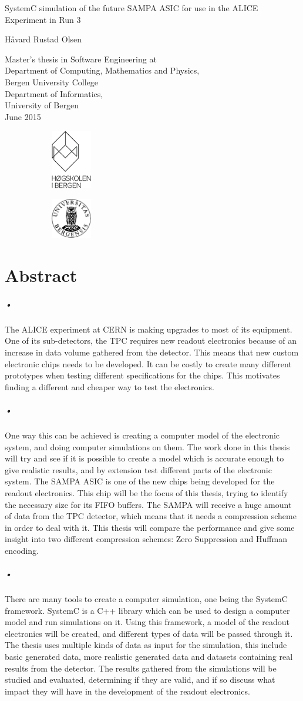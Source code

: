 \documentclass[a4paper, 12pt, openright, twoside]{report}
\newcommand*{\titlePage}{\begingroup %
\fontfamily{phv}\selectfont
\centering %

\vspace{200pt}
{\Huge SystemC simulation of the future SAMPA ASIC for use in the ALICE Experiment in Run 3} \\ %
\vspace{5pt}

{\Large \textsl{}} %
\vspace{50pt}

{\Large{H\r{a}vard Rustad Olsen}}\\ %

\vfill %

{\Large Master's thesis in Software Engineering at \\
\vspace{10pt}
Department of Computing, Mathematics and Physics, \\
Bergen University College \\
\vspace{10pt}
Department of  Informatics, \\
University of Bergen \\}
\vspace{10pt}
{\large June 2015} %


\begin{figure}[h]
		\begin{subfigure}[]{50pt}
			\includegraphics[width=50pt]{HIB_sort_hovedlogo.eps}
		\end{subfigure}
		\hfill
		\begin{subfigure}[]{50pt}
			\includegraphics[width=50pt]{uib-logo.eps}
		\end{subfigure}

\end{figure}

\endgroup}
\begin{document}
\pagestyle{empty} %

\titlePage %

\newpage
\mbox{}
\thispagestyle{empty}
\newpage

\chapter*{Abstract}

\paragraph{•}
The ALICE experiment at CERN is making upgrades to most of its equipment.
One of its sub-detectors, the TPC requires new readout electronics because of an increase in data volume gathered from the detector.
This means that new custom electronic chips needs to be developed.
It can be costly to create many different prototypes when testing different specifications for the chips.
This motivates finding a different and cheaper way to test the electronics.

\paragraph{•}
One way this can be achieved is creating a computer model of the electronic system, and doing computer simulations on them.
The work done in this thesis will try and see if it is possible to create a model which is accurate enough to give realistic results, and by extension test different parts of the electronic system.
The SAMPA ASIC is one of the new chips being developed for the readout electronics.
This chip will be the focus of this thesis, trying to identify the necessary size for its FIFO buffers.
The SAMPA will receive a huge amount of data from the TPC detector, which means that it needs a compression scheme in order to deal with it.
This thesis will compare the performance and give some insight into two different compression schemes: Zero Suppression and Huffman encoding.

\paragraph{•}
There are many tools to create a computer simulation, one being the SystemC framework.
SystemC is a C++ library which can be used to design a computer model and run simulations on it.
Using this framework, a model of the readout electronics will be created, and different types of data will be passed through it.
The thesis uses multiple kinds of data as input for the simulation, this include basic generated data, more realistic generated data and datasets containing real results from the detector.
The results gathered from the simulations will be studied and evaluated, determining if they are valid, and if so discuss what impact they will have in the development of the readout electronics.
\end{document}
